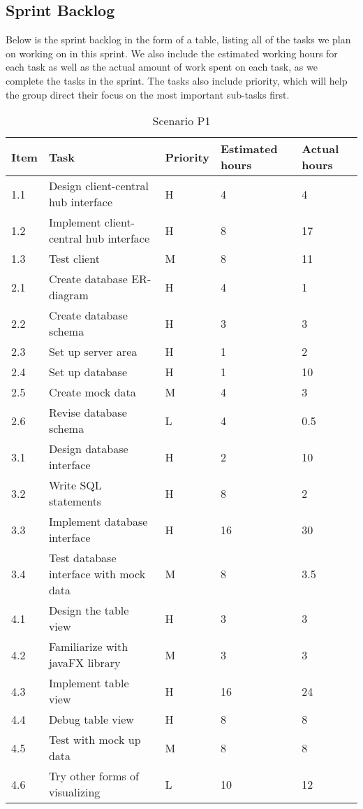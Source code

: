 \documentclass[../document.tex]{subfiles}
\begin{document}
\subsection{Sprint Backlog}
Below is the sprint backlog in the form of a table, listing all of the tasks we plan on working on in this sprint. We also include the estimated working hours for each task as well as the actual amount of work spent on each task, as we complete the tasks in the sprint. The tasks also include priority, which will help the group direct their focus on the most important sub-tasks first.


\begin{table}[H]
\caption{Scenario P1}
\begin{tabularx}{\textwidth}{|l|X|l|l|l|}
\hline
Item
&Task
&Priority
&Estimated hours
&Actual hours
\\ \hline1.1
&Design client-central hub interface
&H
&4
&4
\\ \hline1.2
&Implement client-central hub interface
&H
&8
&17
\\ \hline1.3
&Test client
&M
&8
&11
\\ \hline2.1
&Create database ER-diagram
&H
&4
&1
\\ \hline2.2
&Create database schema
&H
&3
&3
\\ \hline2.3
&Set up server area
&H
&1
&2
\\ \hline2.4
&Set up database
&H
&1
&10
\\ \hline2.5
&Create mock data
&M
&4
&3
\\ \hline2.6
&Revise database schema
&L
&4
&0.5
\\ \hline3.1
&Design database interface
&H
&2
&10
\\ \hline3.2
&Write \gls{SQL} statements
&H
&8
&2
\\ \hline3.3
&Implement database interface
&H
&16
&30
\\ \hline3.4
&Test database interface with mock data
&M
&8
&3.5
\\ \hline4.1
&Design the table view
&H
&3
&3
\\ \hline4.2
&Familiarize with javaFX library
&M
&3
&3
\\ \hline4.3
&Implement table view
&H
&16
&24
\\ \hline4.4
&Debug table view
&H
&8
&8
\\ \hline4.5
&Test with mock up data
&M
&8
&8
\\ \hline4.6
&Try other forms of visualizing
&L
&10
&12
\\ \hline
\end{tabularx}
\end{table}
\end{document}
